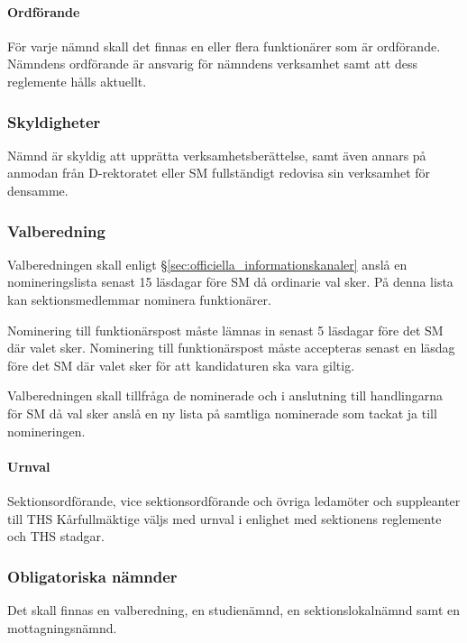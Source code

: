 \documentclass{dgovdoc}
\begin{document}
\paragraph{Ordförande}

För varje nämnd skall det finnas en eller flera funktionärer som är ordförande.
Nämndens ordförande är ansvarig för nämndens verksamhet samt att dess
reglemente hålls aktuellt.

\subsubsection{Skyldigheter}

Nämnd är skyldig att upprätta verksamhetsberättelse, samt även annars på
anmodan från D-rektoratet eller SM fullständigt redovisa sin verksamhet för
densamme.

\subsubsection{Valberedning}

Valberedningen skall enligt \S\ref{sec:officiella_informationskanaler} anslå en
nomineringslista senast 15 läsdagar före SM då ordinarie val sker. På denna
lista kan sektionsmedlemmar nominera funktionärer.

Nominering till funktionärspost måste lämnas in senast 5 läsdagar före det SM
där valet sker. Nominering till funktionärspost måste accepteras senast en
läsdag före det SM där valet sker för att kandidaturen ska vara giltig.

Valberedningen skall tillfråga de nominerade och i anslutning till handlingarna
för SM då val sker anslå en ny lista på samtliga nominerade som tackat ja till
nomineringen.

\paragraph{Urnval}

Sektionsordförande, vice sektionsordförande och övriga ledamöter och
suppleanter till THS Kårfullmäktige väljs med urnval i enlighet med sektionens
reglemente och THS stadgar.

\subsubsection{Obligatoriska nämnder}

Det skall finnas en valberedning, en studienämnd, en sektionslokalnämnd samt en
mottagningsnämnd.
\end{document}
